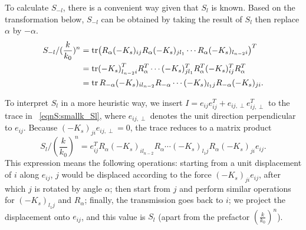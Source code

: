 \documentclass[
 amsmath,amssymb,
 aps,
 pre,
 longbibliography,
 10pt, onecolumn,
 notitlepage
]{revtex4-1}
\begin{document}
To calculate $S_{-l}$, there is a convenient way given that $S_l$ is known.
Based on the transformation below, $S_{-l}$ can be obtained by taking the result of $S_l$ then replace $\alpha$ by $-\alpha$.
\begin{equation} \label{eqnS:smallk_S-l}
    \begin{split}
    S_{-l} / (\frac{k}{k_0})^n
    &= \tr (R_\alpha (-K_s)_{ij} R_\alpha (-K_s)_{jl_1} \cdots R_\alpha  (-K_s)_{l_{n-2}i})^T \\
    &= \tr (-K_s)_{l_{n-2}i}^T R_\alpha^T \cdots (-K_s)_{jl_1}^T R_\alpha^T (-K_s)_{ij}^T R_\alpha^T \\
    &= \tr R_{-\alpha} (-K_s)_{il_{n-2}} R_{-\alpha} \cdots (-K_s)_{l_1j} R_{-\alpha} (-K_s)_{ji}.
    \end{split}
\end{equation}

To interpret $S_l$ in a more heuristic way, we insert $I = e_{ij}e_{ij}^T + e_{ij,\perp}e_{ij,\perp}^T$ to the trace in \eqnname~\eqref{eqnS:smallk_Sl}, where $e_{ij,\perp}$ denotes the unit direction perpendicular to $e_{ij}$.
Because $(-K_s)_{ji}e_{ij,\perp} = 0$, the trace reduces to a matrix product
\begin{equation} \label{eqnS:smallk_path_vector}
    S_l/(\frac{k}{k_0})^n = e_{ij}^T R_\alpha (-K_s)_{i l_{n-2}} R_\alpha \cdots (-K_s)_{l_1j} R_\alpha (-K_s)_{ji} e_{ij}.
\end{equation}
This expression means the following operations:
starting from a unit displacement of $i$ along $e_{ij}$, $j$ would be displaced according to the force $(-K_s)_{ji} e_{ij}$, after which $j$ is rotated by angle $\alpha$; then start from $j$ and perform similar operations for $(-K_s)_{l_1j}$ and $R_\alpha$; finally, the transmission goes back to $i$; we project the displacement onto $e_{ij}$, and this value is $S_l$ (apart from the prefactor $(\frac{k}{k_0})^n$).
\end{document}
